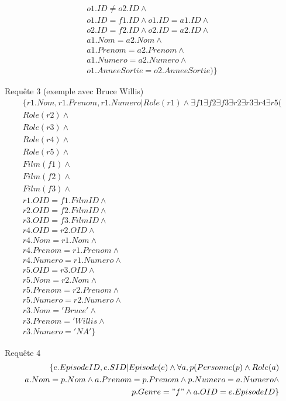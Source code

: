 \documentclass[10pt,a4paper]{article}
\begin{document}
\begin{list}{*}{}
\[\begin{aligned}
       o1.ID \neq o2.ID \wedge \\
       o1.ID = f1.ID \wedge o1.ID = a1.ID \wedge \\
       o2.ID = f2.ID \wedge o2.ID = a2.ID \wedge \\
       a1.Nom = a2.Nom \wedge \\
       a1.Prenom = a2.Prenom \wedge \\
       a1.Numero = a2.Numero \wedge \\
       o1.AnneeSortie = o2.AnneeSortie) \}
\end{aligned}\]
\item Requête 3 (exemple avec Bruce Willis)
\noindent
\[\begin{aligned}
\{ r1.Nom, r1.Prenom, r1.Numero | Role(r1) \wedge \exists f1 \exists f2 \exists f3 \exists r2 \exists r3\exists r4 \exists r5(\\
	Role(r2) \wedge \\
    Role(r3) \wedge \\
    Role(r4) \wedge \\
    Role(r5) \wedge \\
    Film(f1) \wedge \\
    Film(f2) \wedge \\
    Film(f3) \wedge \\
    r1.OID = f1.FilmID \wedge \\
    r2.OID = f2.FilmID \wedge \\
    r3.OID = f3.FilmID \wedge \\
    r4.OID = r2.OID \wedge \\
    r4.Nom = r1.Nom \wedge \\
    r4.Prenom = r1.Prenom \wedge \\
    r4.Numero = r1.Numero \wedge \\
    r5.OID = r3.OID \wedge \\
    r5.Nom = r2.Nom \wedge \\
    r5.Prenom = r2.Prenom \wedge \\
    r5.Numero = r2.Numero \wedge \\
    r3.Nom = 'Bruce' \wedge \\
    r3.Prenom = 'Willis \wedge \\
    r3.Numero = 'NA'\}
\end{aligned}\]


\item Requête 4
\noindent
\[\begin{aligned}
\{e.EpisodeID, e.SID | Episode(e) \wedge \forall a, p (Personne(p) \wedge Role(a) \\
 	   a.Nom  = p.Nom \wedge a.Prenom = p.Prenom \wedge p.Numero = a.Numero \wedge \\
       p.Genre = "f" \wedge a.OID = e.EpisodeID \}
\end{aligned}\]
\end{list}
\end{document}
